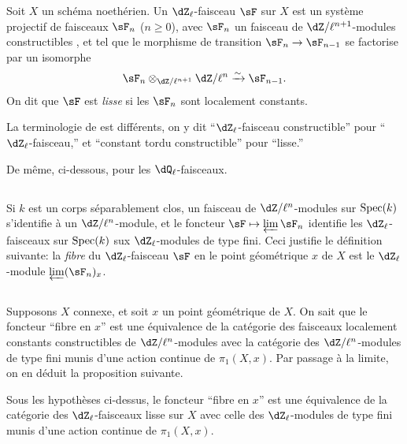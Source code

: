\begin{definition_}\label{II:2-1}
Soit $X$ un schéma noethérien. Un $\dZ_\ell$-faisceau $\sF$ sur $X$ est un 
système projectif de faisceaux $\sF_n$ ($n\geqslant 0$), avec $\sF_n$ un 
faisceau de $\dZ/\ell^{n+1}$-modules constructibles \cite[IX.2]{sga4}, et tel que 
le morphisme de transition $\sF_n\to\sF_{n-1}$ se factorise par un isomorphe 
\[
  \sF_n\otimes_{\dZ/\ell^{n+1}} \dZ/\ell^n \iso \sF_{n-1}\text{.}
\]
On dit que $\sF$ est \emph{lisse} si les $\sF_n$ sont localement constants. 
\end{definition_}

La terminologie de \cite{sga5} est différents, on y dit ``$\dZ_\ell$-faisceau 
constructible'' pour ``$\dZ_\ell$-faisceau,'' et ``constant tordu 
constructible'' pour ``lisse.'' 

De même, ci-dessous, pour les $\dQ_\ell$-faisceaux. 





\subsection{}\label{II:2-2}

Si $k$ est un corps séparablement clos, un faisceau de $\dZ/\ell^n$-modules 
sur $\operatorname{Spec}(k)$ s'identifie à un $\dZ/\ell^n$-module, et le foncteur 
$\sF\mapsto \varprojlim \sF_n$ identifie les $\dZ_\ell$-faisceaux sur 
$\operatorname{Spec}(k)$ sux $\dZ_\ell$-modules de type fini. Ceci justifie le définition 
suivante: la \emph{fibre} du $\dZ_\ell$-faisceau $\sF$ en le point 
géométrique $x$ de $X$ est le $\dZ_\ell$-module $\varprojlim (\sF_n)_x$. 





\subsection{}\label{II:2-3}

Supposons $X$ connexe, et soit $x$ un point géométrique de $X$. On sait que 
le foncteur ``fibre en $x$'' est une équivalence de la catégorie des 
faisceaux localement constants constructibles de $\dZ/\ell^n$-modules avec la 
catégorie des $\dZ/\ell^n$-modules de type fini munis d'une action continue 
de $\pi_1(X,x)$. Par passage à la limite, on en déduit la proposition 
suivante. 





\begin{proposition_}\label{II:2-4}
Sous les hypothèses ci-dessus, le foncteur ``fibre en $x$'' est une 
équivalence de la catégorie des $\dZ_\ell$-faisceaux lisse sur $X$ avec 
celle des $\dZ_\ell$-modules de type fini munis d'une action continue de 
$\pi_1(X,x)$. 
\end{proposition_}





